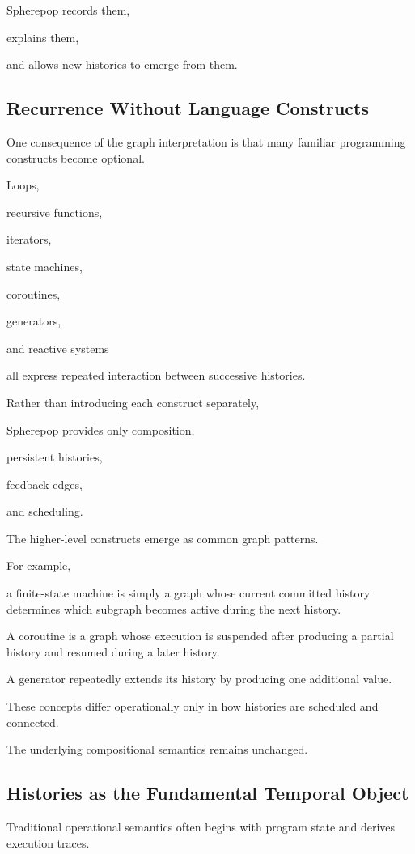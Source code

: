\documentclass[12pt,oneside]{article}
\begin{document}
Spherepop records them,

explains them,

and allows new histories to emerge from them.

\subsection{Recurrence Without Language Constructs}

One consequence of the graph interpretation is that many familiar programming constructs become optional.

Loops,

recursive functions,

iterators,

state machines,

coroutines,

generators,

and reactive systems

all express repeated interaction between successive histories.

Rather than introducing each construct separately,

Spherepop provides only composition,

persistent histories,

feedback edges,

and scheduling.

The higher-level constructs emerge as common graph patterns.

For example,

a finite-state machine is simply a graph whose current committed history determines which subgraph becomes active during the next history.

A coroutine is a graph whose execution is suspended after producing a partial history and resumed during a later history.

A generator repeatedly extends its history by producing one additional value.

These concepts differ operationally only in how histories are scheduled and connected.

The underlying compositional semantics remains unchanged.

\subsection{Histories as the Fundamental Temporal Object}

Traditional operational semantics often begins with program state and derives execution traces.
\end{document}
